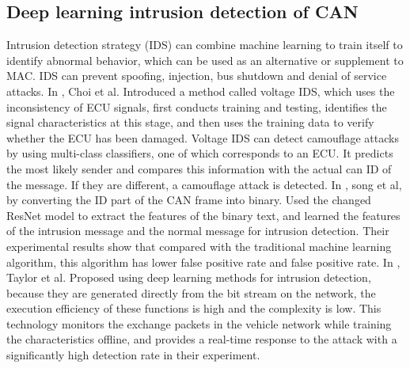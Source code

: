\documentclass[lettersize,journal]{IEEEtran}
\begin{document}
\subsection{Deep learning intrusion detection of CAN}
Intrusion detection strategy (IDS) can combine machine learning to train itself to identify abnormal behavior, which can be used as an alternative or supplement to MAC. IDS can prevent spoofing, injection, bus shutdown and denial of service attacks. In \cite{47}, Choi et al. Introduced a method called voltage IDS, which uses the inconsistency of ECU signals, first conducts training and testing, identifies the signal characteristics at this stage, and then uses the training data to verify whether the ECU has been damaged. Voltage IDS can detect camouflage attacks by using multi-class classifiers, one of which corresponds to an ECU. It predicts the most likely sender and compares this information with the actual can ID of the message. If they are different, a camouflage attack is detected. In \cite{48}, song et al, by converting the ID part of the CAN frame into binary. Used the changed ResNet model to extract the features of the binary text, and learned the features of the intrusion message and the normal message for intrusion detection. Their experimental results show that compared with the traditional machine learning algorithm, this algorithm has lower false positive rate and false positive rate. In \cite{49}, Taylor et al. Proposed using deep learning methods for intrusion detection, because they are generated directly from the bit stream on the network, the execution efficiency of these functions is high and the complexity is low. This technology monitors the exchange packets in the vehicle network while training the characteristics offline, and provides a real-time response to the attack with a significantly high detection rate in their experiment.
\end{document}
